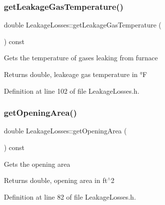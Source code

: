 \subsubsection{\texorpdfstring{get\+Leakage\+Gas\+Temperature()}{getLeakageGasTemperature()}\hspace{0.1cm}{\footnotesize\ttfamily [3/3]}}
{\footnotesize\ttfamily double Leakage\+Losses\+::get\+Leakage\+Gas\+Temperature (\begin{DoxyParamCaption}{ }\end{DoxyParamCaption}) const\hspace{0.3cm}{\ttfamily [inline]}}

Gets the temperature of gases leaking from furnace

\begin{DoxyReturn}{Returns}
double, leakeage gas temperature in °F 
\end{DoxyReturn}


Definition at line 102 of file Leakage\+Losses.\+h.

\mbox{\label{class_leakage_losses_a6b31fbefaa16a5a52ce423b9531e84fa}} 
\subsubsection{\texorpdfstring{get\+Opening\+Area()}{getOpeningArea()}\hspace{0.1cm}{\footnotesize\ttfamily [1/3]}}
{\footnotesize\ttfamily double Leakage\+Losses\+::get\+Opening\+Area (\begin{DoxyParamCaption}{ }\end{DoxyParamCaption}) const\hspace{0.3cm}{\ttfamily [inline]}}

Gets the opening area

\begin{DoxyReturn}{Returns}
double, opening area in ft$^\wedge$2 
\end{DoxyReturn}


Definition at line 82 of file Leakage\+Losses.\+h.

\mbox{\label{class_leakage_losses_a6b31fbefaa16a5a52ce423b9531e84fa}} 
